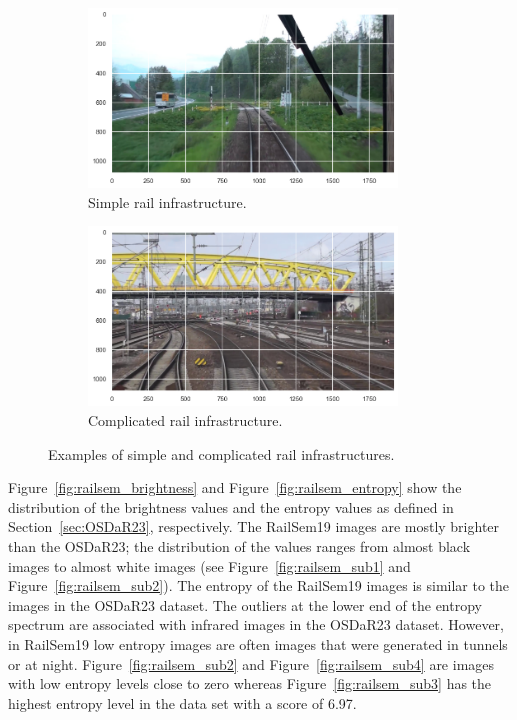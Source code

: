 \documentclass[Master,MDS,english]{BASE/twbook} %
\begin{document}
\begin{figure}[H]
\centering
\begin{subfigure}[t]{.5\textwidth}
  \centering
  \includegraphics[width=0.9\textwidth]{images/datasets/railsem/example_2_tracks}
  \caption{Simple rail infrastructure.}
\end{subfigure}%
\begin{subfigure}[t]{.5\textwidth}
  \centering
  \includegraphics[width=0.9\textwidth]{images/datasets/railsem/example_52_tracks}
  \caption{Complicated rail infrastructure. }
\end{subfigure}
\caption{Examples of simple and complicated rail infrastructures.}
\label{fig:railsem_complicated_vs_simple}
\end{figure}


Figure~\ref{fig:railsem_brightness} and  Figure~\ref{fig:railsem_entropy} show the distribution of the brightness values and the entropy values as defined in Section~\ref{sec:OSDaR23}, respectively. The RailSem19 images are mostly brighter than the OSDaR23; the distribution of the values ranges from almost black images to almost white images (see Figure~\ref{fig:railsem_sub1} and Figure~\ref{fig:railsem_sub2}). The entropy of the RailSem19 images is similar to the images in the OSDaR23 dataset. The outliers at the lower end of the entropy spectrum are associated with infrared images in the OSDaR23 dataset. However, in RailSem19 low entropy images are often images that were generated in tunnels or at night. Figure~\ref{fig:railsem_sub2} and Figure~\ref{fig:railsem_sub4} are images with low entropy levels close to zero whereas Figure~\ref{fig:railsem_sub3} has the highest entropy level in the data set with a score of 6.97.
\end{document}
